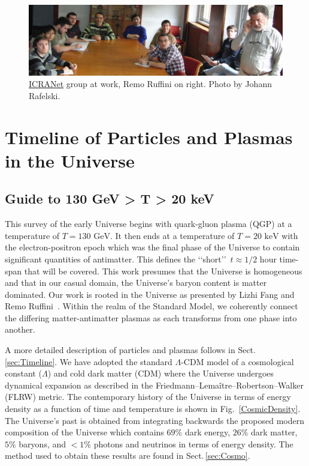 \documentclass[universe,article,submit,moreauthors,pdftex,a4paper]{Definitions/mdpi}
\newcommand{\GeV}{\text{ GeV}}
\newcommand{\keV}{\text{ keV}}
\newcommand*{\rf}[1]{Fig.~{\ref{#1}}}
\newcommand*{\rsec}[1]{Sect.\,{\ref{#1}}}
\begin{document}

\begin{figure}[ht]
 \centering \includegraphics[width=\textwidth]{./plots/12MarchRemoAtWorkC.jpg}
 \caption{\href{https://www.icranet.org/}{ICRANet} group at work, Remo Ruffini on right. Photo by Johann Rafelski. \label{RemoAtWork}}
\end{figure}

\tableofcontents

\section{Timeline of Particles and Plasmas in the Universe}\label{sec:Intro}
\subsection{Guide to 130 GeV > T > 20 keV}\label{sec:Guide}
\noindent This survey of the early Universe begins with quark-gluon plasma (QGP) at a temperature of $T=130\GeV$. It then ends at a temperature of $T=20\keV$ with the electron-positron epoch which was the final phase of the Universe to contain significant quantities of antimatter. This defines the \lq\lq short\rq\rq\ $t\approx1/2$ hour time-span that will be covered. This work presumes that the Universe is homogeneous and that in our casual domain, the Universe's baryon content is matter dominated. Our work is rooted in the Universe as presented by Lizhi Fang and Remo Ruffini~\cite{fang1984cosmology,fang1985galaxies,fang1987quantum}. Within the realm of the Standard Model, we coherently connect the differing matter-antimatter plasmas as each transforms from one phase into another.

A more detailed description of particles and plasmas follows in \rsec{sec:Timeline}. We have adopted the standard $\Lambda$-CDM model of a cosmological constant ($\Lambda$) and cold dark matter (CDM) where the Universe undergoes dynamical expansion as described in the Friedmann–Lemaître–Robertson–Walker (FLRW) metric. The contemporary history of the Universe in terms of energy density as a function of time and temperature is shown in \rf{CosmicDensity}. The Universe's past is obtained from integrating backwards the proposed modern composition of the Universe which contains $69\%$ dark energy, $26\%$ dark matter, $5\%$ baryons, and $<1\%$ photons and neutrinos in terms of energy density. The method used to obtain these results are found in \rsec{sec:Cosmo}.
\end{document}
